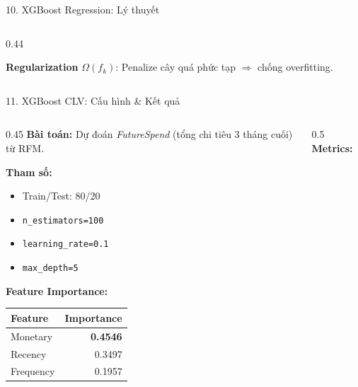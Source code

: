\documentclass[10pt, aspectratio=169]{beamer}
\begin{document}
\begin{frame}{10. XGBoost Regression: Lý thuyết}
\begin{columns}[T]
\begin{column}{0.44\textwidth}
\begin{center}
            \end{center}
            
            \vspace{0.1cm}
            \textbf{Regularization} $\Omega(f_k)$: Penalize cây quá phức tạp $\Rightarrow$ chống overfitting.
        \end{column}
    \end{columns}
\end{frame}

\begin{frame}{11. XGBoost CLV: Cấu hình \& Kết quả}
    \small
    \begin{columns}[T]
        \begin{column}{0.45\textwidth}
            \textbf{Bài toán:} Dự đoán \textit{FutureSpend} (tổng chi tiêu 3 tháng cuối) từ RFM.
            
            \vspace{0.15cm}
            \textbf{Tham số:}
            \begin{itemize}
                \item Train/Test: 80/20
                \item \texttt{n\_estimators=100}
                \item \texttt{learning\_rate=0.1}
                \item \texttt{max\_depth=5}
            \end{itemize}
            
            \vspace{0.15cm}
            \textbf{Feature Importance:}
            
            \begin{tabularx}{\linewidth}{Xr}
                \toprule
                \textbf{Feature} & \textbf{Importance} \\
                \midrule
                Monetary & \textbf{0.4546} \\
                Recency & 0.3497 \\
                Frequency & 0.1957 \\
                \bottomrule
            \end{tabularx}
        \end{column}
        
        \begin{column}{0.5\textwidth}
            \textbf{Metrics:}
            

\end{column}
\end{columns}
\end{frame}
\end{document}
